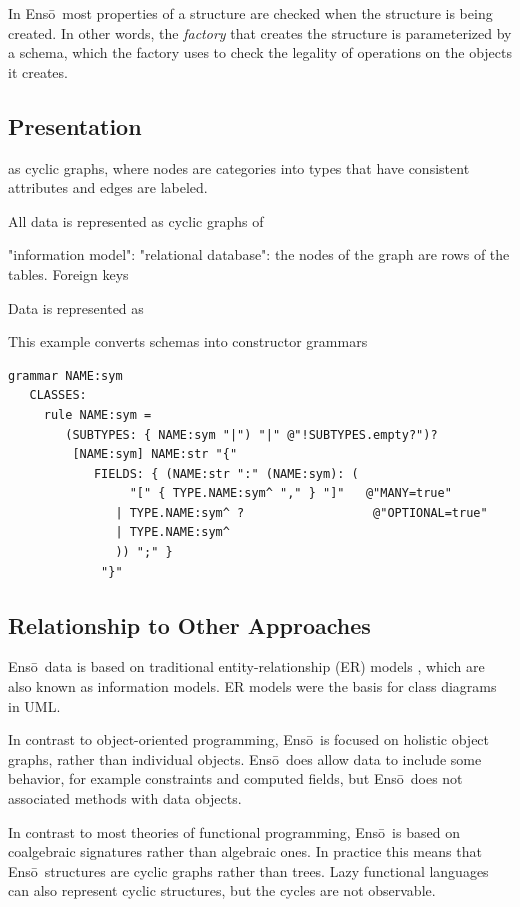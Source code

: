 \documentclass[11pt]{article}
\newcommand{\Enso}{Ens\={o}}
\begin{document}
In \Enso\ most properties of a structure are
checked when the structure is being created. In other words, 
the \textit{factory} that creates the structure is parameterized by a
schema, which the factory uses to check the legality of operations
on the objects it creates.

\subsection{Presentation}






as cyclic graphs, where
nodes are categories into types that have 
consistent attributes and edges are labeled.

All data is represented as cyclic graphs of 


"information model": 
"relational database": the nodes of the graph are
rows of the tables. Foreign keys 

Data is represented as 



This example converts schemas into constructor grammars
\begin{verbatim}
grammar NAME:sym
   CLASSES:
     rule NAME:sym = 
        (SUBTYPES: { NAME:sym "|") "|" @"!SUBTYPES.empty?")?
         [NAME:sym] NAME:str "{" 
            FIELDS: { (NAME:str ":" (NAME:sym): (
                 "[" { TYPE.NAME:sym^ "," } "]"   @"MANY=true"
               | TYPE.NAME:sym^ ?                  @"OPTIONAL=true"
               | TYPE.NAME:sym^
               )) ";" }
             "}"
\end{verbatim}

\subsection{Relationship to Other Approaches}
\label{relatedwork}

\Enso\ data is based on traditional 
entity-relationship (ER) models \cite{FOO},
which are also known as information models. 
ER models were the basis for class diagrams in UML.

In contrast to
object-oriented programming, \Enso\ is focused on holistic
object graphs, rather than individual objects. \Enso\ 
does allow data to include some behavior, for example constraints
and computed fields, but \Enso\ does not associated methods
with data objects.

In contrast to
most theories of functional programming, \Enso\ is based on
coalgebraic signatures rather than algebraic ones. In practice
this means that \Enso\ structures are cyclic graphs rather than
trees. Lazy functional languages can also represent cyclic 
structures, but the cycles are not observable.
\end{document}
